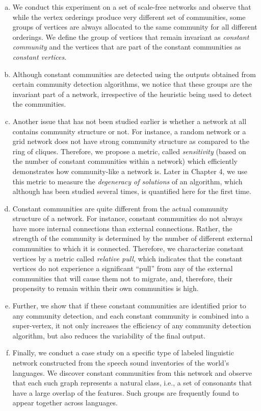 \begin{enumerate}[(a)]

 \item We conduct this experiment on a set of scale-free networks and observe that while the vertex orderings produce very different set of
communities, some groups of vertices are always allocated to the same community for all different orderings. We define the group of vertices
that remain invariant as {\em constant community} and the vertices that are part of the constant communities as {\em constant vertices}. 

\item Although constant communities are detected using the outputs obtained from certain community detection algorithms, we notice that
these groups are the invariant part of a network, irrespective of the heuristic being used to detect the communities.

\item Another issue that has not been studied earlier is whether a network at all contains community structure or not. For instance, a
random network or a grid network does not have strong community structure as compared to the ring of cliques. Therefore, we propose a
metric, called {\em sensitivity} (based on the number of constant communities within a network) which efficiently demonstrates how
community-like a network is. Later in Chapter 4, we use this metric to measure the {\em degeneracy of solutions} of an algorithm,
which although has been studied several times, is quantified here for the first time.   

\item Constant communities are quite different from the actual community structure of a network. For instance, constant
communities do not always have more internal connections than external connections. Rather, the strength of the community is determined by
the number of different external communities to which it is connected. Therefore, we characterize constant vertices by a metric
called {\em relative pull}, which indicates that the constant vertices do not experience a significant ``pull'' from any of the
external communities that will cause them not to migrate, and, therefore, their propensity to remain within their own communities is high. 

\item Further, we show that if these constant communities are identified prior to any community detection, and each constant community is
combined into a super-vertex, it not only increases the efficiency of any community detection algorithm, but also reduces the
variability of the final output.

\item Finally, we conduct a case study on a specific type of labeled linguistic network constructed from the speech sound inventories of the
world's languages. We discover constant communities from this network and observe that each such graph  represents a natural
class, i.e., a set of consonants that have a large overlap of the features. Such groups are frequently found to appear together across
languages. 

\end{enumerate}

